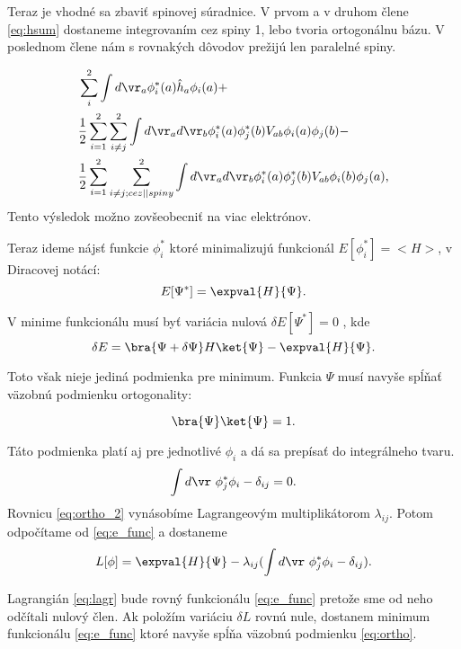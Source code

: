 Teraz je vhodné sa zbaviť spinovej súradnice. V prvom a v druhom člene \eqref{eq:hsum} dostaneme integrovaním cez spiny 1, lebo tvoria ortogonálnu bázu.
V poslednom člene nám s rovnakých dôvodov   prežijú len paralelné spiny.

\begin{align}
 \label{eq:hsum}
 &\sum_i^2 \int d\vr_a \phi^*_i(a)\hat h_a \phi_i(a) +\\ \notag
 &\frac{1}{2} \sum_{i=1}^2{\sum_{i\neq j}^2 \int d\vr_a d\vr_b\phi_i^*(a)\phi_j^*(b)V_{ab}\phi_i(a)\phi_j(b)}-\\ \notag
 &\frac{1}{2} \sum_{i=1}^2{\sum_{i\neq j;cez || spiny}^2 \int d\vr_a d\vr_b\phi_i^*(a)\phi_j^*(b)V_{ab}\phi_i(b)\phi_j(a)} \text{,} \notag
\end{align}
Tento výsledok možno zovšeobecniť na viac elektrónov.

Teraz ideme nájsť funkcie $\phi_i^*$ ktoré minimalizujú funkcionál $E[\phi^*_i]=<H>$, v Diracovej notácí:
\begin{equation}
 \label{eq:e_func}
 E[\Psi^*]=\expval{H}{\Psi} \text{.}
\end{equation}

V minime funkcionálu musí byť variácia nulová $\delta E[\Psi^*]=0$ , kde
\begin{equation}
 \label{eq:e_var}
 \delta E=\bra{\Psi+\delta \Psi}H\ket{\Psi}-\expval{H}{\Psi} \text{.}
\end{equation}

\newpage
Toto však nieje jediná podmienka pre minimum. Funkcia $\Psi$ musí navyše spĺňať väzobnú podmienku ortogonality:

\begin{equation}
 \label{eq:ortho}
 \bra{\Psi}\ket{\Psi}=1 \text{.}
\end{equation}

Táto podmienka platí aj pre jednotlivé $\phi_i$ a dá sa prepísať do integrálneho tvaru.
\begin{equation}
 \label{eq:ortho_2}
 \int{ d\vr\ \phi^*_j\phi_i }-\delta_{ij}=0 \text{.}
 \end{equation}
Rovnicu \eqref{eq:ortho_2} vynásobíme Lagrangeovým multiplikátorom $\lambda_{ij}$. Potom odpočítame od \ref{eq:e_func} a dostaneme
\begin{equation}
 \label{eq:lagr}
 L[\phi]=\expval{H}{\Psi}-\lambda_{ij}( \int{ d\vr\ \phi^*_j\phi_i }-\delta_{ij})\text{.}
\end{equation}

Lagrangián \eqref{eq:lagr} bude rovný funkcionálu \eqref{eq:e_func} pretože sme od neho odčítali nulový člen. Ak položím variáciu $\delta L$ rovnú nule,
dostanem minimum funkcionálu \eqref{eq:e_func} ktoré navyše spĺňa väzobnú podmienku \eqref{eq:ortho}.

